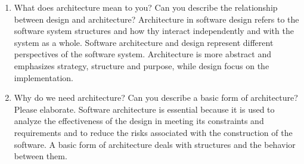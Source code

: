 \documentclass[12pt]{article}
\begin{document}
\begin{enumerate}
\begin{enumerate}[start=1,align=left]
      \item What does architecture mean to you? Can you describe the relationship between design and architecture?
      Architecture in software design refers to the software system structures and how thy interact independently and with the system as a whole. Software architecture and design represent different perspectives of the software system. Architecture is more abstract and emphasizes strategy, structure and purpose, while design focus on the implementation.

      \item Why do we need architecture? Can you describe a basic form of architecture? Please elaborate.
      Software architecture is essential because it is used to analyze the effectiveness of the design in meeting its constraints and requirements and to reduce the risks associated with the construction of the software. A basic form of architecture deals with structures and the behavior between them.

    \end{enumerate}






\end{enumerate}
\end{document}
